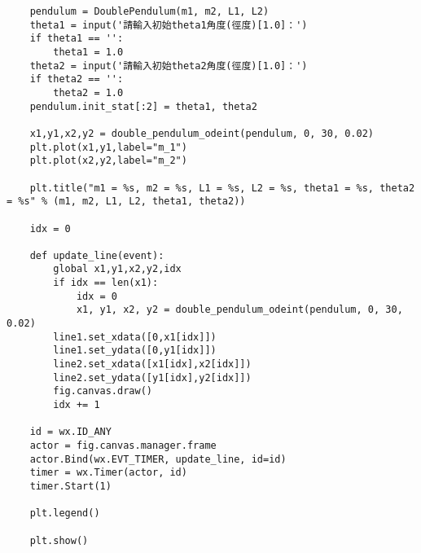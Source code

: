 \documentclass[UTF8,a4paper,12pt]{article}
\begin{document}
\begin{lstlisting}
    pendulum = DoublePendulum(m1, m2, L1, L2)
    theta1 = input('請輸入初始theta1角度(徑度)[1.0]：')
    if theta1 == '':
        theta1 = 1.0
    theta2 = input('請輸入初始theta2角度(徑度)[1.0]：')
    if theta2 == '':
        theta2 = 1.0
    pendulum.init_stat[:2] = theta1, theta2
    
    x1,y1,x2,y2 = double_pendulum_odeint(pendulum, 0, 30, 0.02)
    plt.plot(x1,y1,label="m_1")
    plt.plot(x2,y2,label="m_2")
    
    plt.title("m1 = %s, m2 = %s, L1 = %s, L2 = %s, theta1 = %s, theta2 = %s" % (m1, m2, L1, L2, theta1, theta2))
    
    idx = 0
    
    def update_line(event):
        global x1,y1,x2,y2,idx
        if idx == len(x1):
            idx = 0
            x1, y1, x2, y2 = double_pendulum_odeint(pendulum, 0, 30, 0.02)
        line1.set_xdata([0,x1[idx]])
        line1.set_ydata([0,y1[idx]])
        line2.set_xdata([x1[idx],x2[idx]])
        line2.set_ydata([y1[idx],y2[idx]])
        fig.canvas.draw()
        idx += 1
    
    id = wx.ID_ANY
    actor = fig.canvas.manager.frame
    actor.Bind(wx.EVT_TIMER, update_line, id=id)
    timer = wx.Timer(actor, id)
    timer.Start(1)
    
    plt.legend()
    
    plt.show()
\end{lstlisting}
\end{document}
